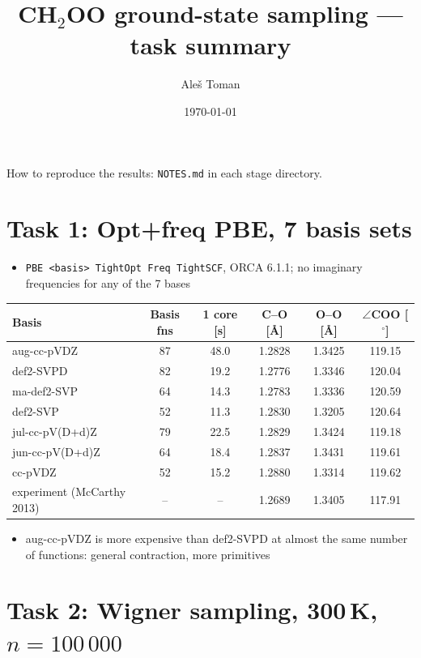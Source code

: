 \documentclass[11pt,a4paper]{article}
\title{CH$_2$OO ground-state sampling --- task summary}
\author{Aleš Toman}
\date{\today}
\begin{document}
\maketitle

How to reproduce the results: \texttt{NOTES.md} in each stage directory.

\section*{Task 1: Opt+freq PBE, 7 basis sets}

\begin{itemize}\itemsep2pt
  \item \texttt{PBE <basis> TightOpt Freq TightSCF}, ORCA 6.1.1; no imaginary frequencies for any of the 7 bases
\end{itemize}

\begin{table}[H]
\centering
\small
\begin{tabular}{lSSccc}
\toprule
Basis & {Basis fns} & {1 core [s]} & C--O [\AA] & O--O [\AA] & $\angle$COO [$^\circ$] \\
\midrule
aug-cc-pVDZ & 87 & 48.0 & 1.2828 & 1.3425 & 119.15 \\
def2-SVPD   & 82 & 19.2 & 1.2776 & 1.3346 & 120.04 \\
ma-def2-SVP & 64 & 14.3 & 1.2783 & 1.3336 & 120.59 \\
def2-SVP    & 52 & 11.3 & 1.2830 & 1.3205 & 120.64 \\
jul-cc-pV(D+d)Z & 79 & 22.5 & 1.2829 & 1.3424 & 119.18 \\
jun-cc-pV(D+d)Z & 64 & 18.4 & 1.2837 & 1.3431 & 119.61 \\
cc-pVDZ     & 52 & 15.2 & 1.2880 & 1.3314 & 119.62 \\
experiment (McCarthy 2013) & {--} & {--} & 1.2689 & 1.3405 & 117.91 \\
\bottomrule
\end{tabular}
\end{table}

\begin{itemize}\itemsep2pt
  \item aug-cc-pVDZ is more expensive than def2-SVPD at almost the same number of functions: general contraction, more primitives
\end{itemize}

\clearpage
\section*{Task 2: Wigner sampling, 300\,K, $n = 100\,000$}
\end{document}
